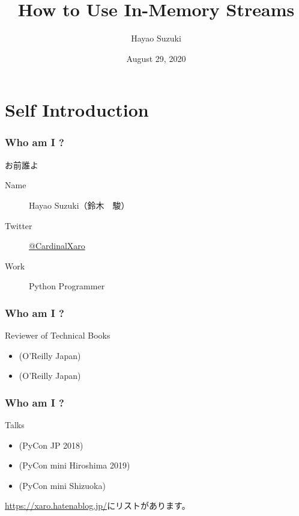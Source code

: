 \documentclass[aspectratio=169,dvipdfmx,14pt,notheorems]{beamer}
\title{How to Use In-Memory Streams}
\author[Hayao]{Hayao Suzuki}
\institute[PyCon JP 2020]{PyCon JP 2020 \#pyconjp\_1}
\date{August 29, 2020}
\theoremstyle{definition}
\begin{document}
\begin{frame}[plain]\frametitle{}
\titlepage %
\end{frame}

\section{Self Introduction}

\begin{frame}\frametitle{Who am I ?}

\begin{block}{お前誰よ}
\begin{description}
\item[Name] Hayao Suzuki（鈴木　駿）
\item[Twitter] \href{https://twitter.com/CardinalXaro}{@CardinalXaro}
\item[Work] Python Programmer
\end{description}
\end{block}

\end{frame}

\begin{frame}\frametitle{Who am I ?}

\begin{block}{Reviewer of Technical Books}
\begin{itemize}
\item {}(O'Reilly Japan)
\item {}(O'Reilly Japan)
\end{itemize}
\end{block}

\end{frame}

\begin{frame}\frametitle{Who am I ?}

\begin{block}{Talks}
\begin{itemize}
\item {}(PyCon JP 2018)
\item {}(PyCon mini Hiroshima 2019)
\item {}(PyCon mini Shizuoka)
\end{itemize}
\end{block}
\url{https://xaro.hatenablog.jp/}にリストがあります。
\end{frame}
\end{document}
